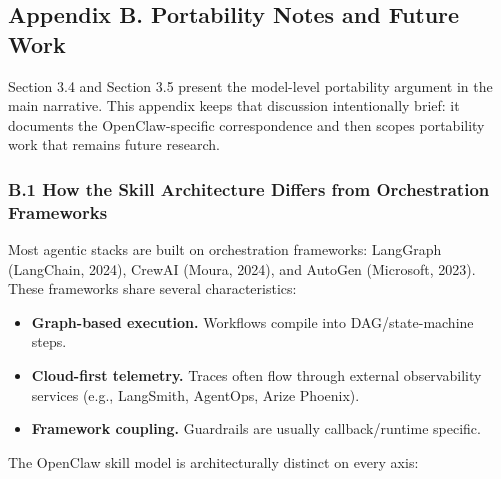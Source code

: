 \documentclass[
]{article}
\providecommand{\tightlist}{%
  \setlength{\itemsep}{0pt}\setlength{\parskip}{0pt}}
\begin{document}
\subsection{Appendix B. Portability Notes and Future
Work}\label{appendix-b.-portability-notes-and-future-work}

Section 3.4 and Section 3.5 present the model-level portability argument
in the main narrative. This appendix keeps that discussion intentionally
brief: it documents the OpenClaw-specific correspondence and then scopes
portability work that remains future research.

\subsubsection{B.1 How the Skill Architecture Differs from Orchestration
Frameworks}\label{b.1-how-the-skill-architecture-differs-from-orchestration-frameworks}

Most agentic stacks are built on orchestration frameworks: LangGraph
(LangChain, 2024), CrewAI (Moura, 2024), and AutoGen (Microsoft, 2023).
These frameworks share several characteristics:

\begin{itemize}
\tightlist
\item
  \textbf{Graph-based execution.} Workflows compile into
  DAG/state-machine steps.
\item
  \textbf{Cloud-first telemetry.} Traces often flow through external
  observability services (e.g., LangSmith, AgentOps, Arize Phoenix).
\item
  \textbf{Framework coupling.} Guardrails are usually callback/runtime
  specific.
\end{itemize}

The OpenClaw skill model is architecturally distinct on every axis:
\end{document}
